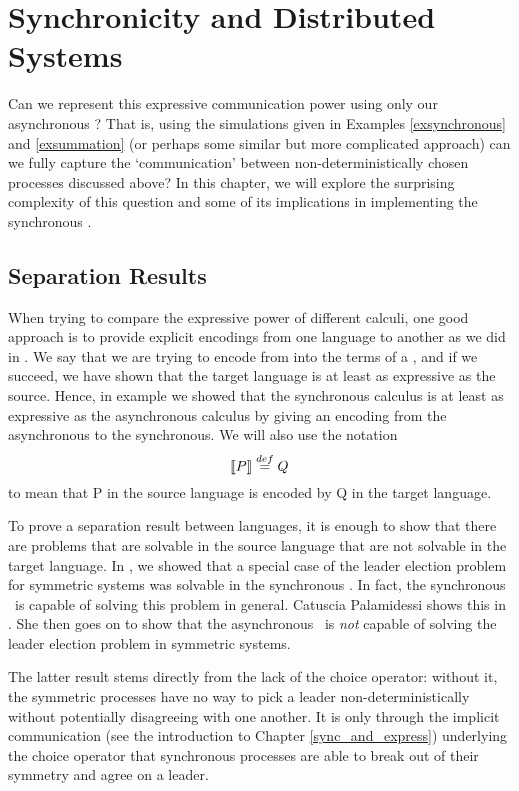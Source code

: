 \chapter{Synchronicity and Distributed Systems}\label{sync_and_dist_sys}
Can we represent this expressive communication power using only our asynchronous \picalc?  That is, using the simulations given in Examples \ref{exsynchronous} and \ref{exsummation} (or perhaps some similar but more complicated approach) can we fully capture the `communication' between non-deterministically chosen processes discussed above?  In this chapter, we will explore the surprising complexity of this question and some of its implications in implementing the synchronous \picalc.  



\section{Separation Results}\label{Separation Results}
When trying to compare the expressive power of different calculi, one good approach is to provide explicit encodings from one language to another as we did in .
We say that we are trying to encode from  into the terms of a , and if we succeed, we have shown that the target language is at least as expressive as the source.  
Hence, in example  we showed that the synchronous calculus is at least as expressive as the asynchronous calculus by giving an encoding from the asynchronous to the synchronous.  
We will also use the notation
\[
	\llbracket{P}\rrbracket \overset{\tiny{def}}{=} Q
\]
to mean that P in the source language is encoded by Q in the target language.

To prove a separation result between languages, it is enough to show that there are problems that are solvable in the source language that are not solvable in the target language.
In , we showed that a special case of the leader election problem for symmetric systems was solvable in the synchronous \picalc.
In fact, the synchronous \picalc\ is capable of solving this problem in general.
Catuscia Palamidessi shows this in \cite{palam03}.
She then goes on to show that the asynchronous \picalc\ is \emph{not} capable of solving the leader election problem in symmetric systems.
 
The latter result stems directly from the lack of the choice operator: without it, the symmetric processes have no way to pick a leader non-deterministically without potentially disagreeing with one another.  
It is only through the implicit communication (see the introduction to Chapter \ref{sync_and_express}) underlying the choice operator that synchronous processes are able to break out of their symmetry and agree on a leader.

